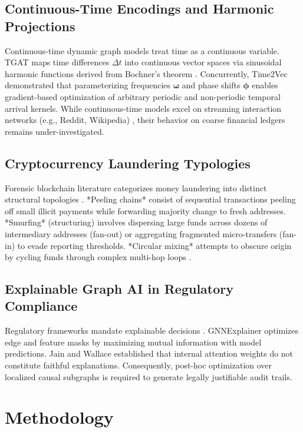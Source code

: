 \documentclass[conference]{IEEEtran}
\begin{document}
\subsection{Continuous-Time Encodings and Harmonic Projections}
Continuous-time dynamic graph models treat time as a continuous variable. TGAT \cite{xu2020tgat} maps time differences $\Delta t$ into continuous vector spaces via sinusoidal harmonic functions derived from Bochner's theorem \cite{rahimi2007random}. Concurrently, Time2Vec \cite{kazemi2019time2vec} demonstrated that parameterizing frequencies $\boldsymbol{\omega}$ and phase shifts $\boldsymbol{\phi}$ enables gradient-based optimization of arbitrary periodic and non-periodic temporal arrival kernels. While continuous-time models excel on streaming interaction networks (e.g., Reddit, Wikipedia) \cite{rossi2020tgn, kumar2019jodie}, their behavior on coarse financial ledgers remains under-investigated.

\subsection{Cryptocurrency Laundering Typologies}
Forensic blockchain literature categorizes money laundering into distinct structural topologies \cite{meiklejohn2013fistful, moser2013inquiry}. *Peeling chains* consist of sequential transactions peeling off small illicit payments while forwarding majority change to fresh addresses. *Smurfing* (structuring) involves dispersing large funds across dozens of intermediary addresses (fan-out) or aggregating fragmented micro-transfers (fan-in) to evade reporting thresholds. *Circular mixing* attempts to obscure origin by cycling funds through complex multi-hop loops \cite{wu2021mixing}.

\subsection{Explainable Graph AI in Regulatory Compliance}
Regulatory frameworks mandate explainable decisions \cite{fincen2019guidance}. GNNExplainer \cite{ying2019gnnexplainer} optimizes edge and feature masks by maximizing mutual information with model predictions. Jain and Wallace \cite{jain2019attention} established that internal attention weights do not constitute faithful explanations. Consequently, post-hoc optimization over localized causal subgraphs is required to generate legally justifiable audit trails.

\section{Methodology}
\end{document}
